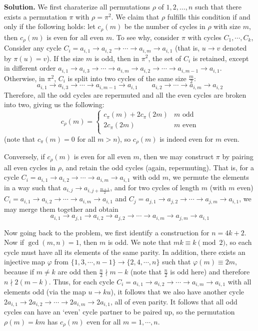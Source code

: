 \documentclass[11pt,a4paper]{article}
\begin{document}
\begin{enumerate}
		\textbf{Solution.} 
		We first charaterize all permutations $\rho$ of $1, 2, \dots, n$ such that there exists a permutation $\pi$ with $\rho=\pi^2$. 
		We claim that $\rho$ fulfills this condition if and only if the following holds: 
		let $c_{\rho}(m)$ be the number of cycles in $\rho$ with size $m$, 
		then $c_{\rho}(m)$ is even for all even $m$. 
		To see why, consider $\pi$ with cycles $C_1, \cdots, C_k$, 
		Consider any cycle $C_i = a_{i, 1}\to a_{i, 2}\to \cdots \to a_{i, m}\to a_{i, 1}$ 
		(that is, $u\to v$ denoted by $\pi(u)=v$). 
		If the size $m$ is odd, then in $\pi^2$, the set of $C_i$ is retained, 
		except in different order 
		$a_{i, 1}\to a_{i, 3}\to \cdots \to a_{i, m}\to a_{i, 2}\to \cdots \to a_{i, m - 1}\to a_{i, 1}$. 
		Otherwise, 
		in $\pi^2$, $C_i$ is split into two cycles of the same size $\frac{m}{2}$: 
		\[
		a_{i, 1}\to a_{i, 3}\to \cdots \to a_{i, m - 1}\to a_{i, 1}
		\qquad 
		a_{i, 2}\to \cdots \to a_{i, m}\to a_{i, 2}
		\]
		Therefore, all the odd cycles are repermuted and all the even cycles are broken into two, giving us the following: 
		\[
		c_{\rho}(m) 
		= \begin{cases}
			c_{\pi}(m) + 2c_{\pi}(2m) & \text{$m$ odd}\\
			2c_{\pi}(2m) & \text{$m$ even}\\
		\end{cases}
		\]
		(note that $c_{\pi}(m)=0$ for all $m > n$), 
		so $c_{\rho}(m)$ is indeed even for $m$ even. 
		
		Conversely, if $c_{\rho}(m)$ is even for all even $m$, 
		then we may construct $\pi$ by pairing all even cycles in $\rho$, 
		and retain the odd cycles (again, repermuting). 
		That is, for a cycle 
		$C_i = a_{i, 1}\to a_{i, 2}\to \cdots \to a_{i, m}\to a_{i, 1}$  with odd $m$, 
		we permute the elements in a way such that 
		$a_{i, j}\to a_{i, j + \frac{m+1}{2}}$, 
		and for two cycles of length $m$ (with $m$ even) 
		$C_i = a_{i, 1}\to a_{i, 2}\to \cdots \to a_{i, m}\to a_{i, 1}$
		and 
		$C_j = a_{j, 1}\to a_{j, 2}\to \cdots \to a_{j, m}\to a_{i, 1}$, 
		we may merge them together and obtain
		\[
		a_{i, 1}\to a_{j, 1}\to a_{i, 2}\to a_{j, 2}
		\to \cdots \to a_{i, m}\to a_{j, m}\to a_{i, 1}
		\]
		
		Now going back to the problem, 
		we first identify a construction for $n=4k+2$. 
		Now if $\gcd(m, n) = 1$, then $m$ is odd. 
		We note that $mk\equiv k\pmod{2}$, 
		so each cycle must have all its elements of the same parity. 
		In addition, there exists an injective map $\varphi$ from 
		$\{1, 3, \cdots, n - 1\}\to \{2, 4, \cdots, n\}$ such that 
		$\varphi(m)\equiv 2m$, 
		because if $m\neq k$ are odd then $\frac{n}{2}\nmid m - k$ (note that $\frac{n}{2}$ is odd here)
		and therefore $n \nmid 2(m - k)$. 
		Thus, for each cycle 
		$C_i = a_{i, 1}\to a_{i, 2}\to \cdots \to a_{i, m}\to a_{i, 1}$ with all elements odd 
		(via the map $u \to ku$), 
		it follows that we also have another cycle 
		$2a_{i, 1}\to 2a_{i, 2}\to \cdots \to 2a_{i, m}\to 2a_{i, 1}$, 
		all of even parity. 
		It follows that all odd cycles can have an `even' cycle partner to be paired up, 
		so the permutation $\rho(m)=km$ has $c_{\rho}(m)$ even for all $m=1, \cdots, n$. 
		

\end{enumerate}
\end{document}

